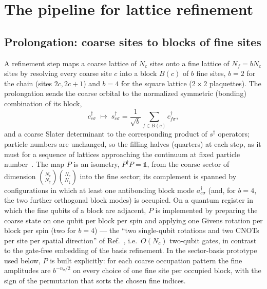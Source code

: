 \documentclass[
  aps,
  prc,
  reprint,
  superscriptaddress,
  floatfix,
  nofootinbib
]{revtex4-2}
\begin{document}
\section{The pipeline for lattice refinement}
\label{sec:pipeline}

\subsection{Prolongation: coarse sites to blocks of fine sites}
\label{sec:prolong}
A refinement step maps a coarse lattice of $N_c$ sites onto a fine lattice of
$N_f=bN_c$ sites by resolving every coarse site $c$ into a block $B(c)$ of
$b$ fine sites, $b=2$ for the chain (sites $2c,2c+1$) and $b=4$ for the
square lattice ($2\times2$ plaquettes).  The prolongation sends the coarse
orbital to the normalized symmetric (bonding) combination of its block,
\begin{equation}
  c^\dagger_{c\sigma}\;\longmapsto\;
  s^\dagger_{c\sigma}=\frac{1}{\sqrt b}\sum_{f\in B(c)}c^\dagger_{f\sigma},
  \label{eq:bonding}
\end{equation}
and a coarse Slater determinant to the corresponding product of
$s^\dagger$ operators; particle numbers are unchanged, so the filling halves
(quarters) at each step, as it must for a sequence of lattices approaching
the continuum at fixed particle number~\cite{Bogner2026}.  The map
$P$ is an isometry, $P^\dagger P=\mathbb 1$, from the coarse sector of
dimension $\binom{N_c}{N_\uparrow}\binom{N_c}{N_\downarrow}$ into the fine
sector; its complement is spanned by configurations in which at least one
antibonding block mode $a^\dagger_{c\sigma}$ (and, for $b=4$, the two further
orthogonal block modes) is occupied.  On a quantum register in which the
fine qubits of a block are adjacent, $P$ is implemented by preparing the
coarse state on one qubit per block per spin and applying one Givens
rotation per block per spin (two for $b=4$) --- the ``two single-qubit
rotations and two CNOTs per site per spatial direction'' of
Ref.~\cite{EigenQPairing2026}, i.e.\ $O(N_c)$ two-qubit gates, in contrast
to the gate-free embedding of the basis refinement.  In the sector-basis
prototype used below, $P$ is built explicitly: for each coarse occupation
pattern the fine amplitudes are $b^{-n_\sigma/2}$ on every choice of one
fine site per occupied block, with the sign of the permutation that sorts
the chosen fine indices.
\end{document}
